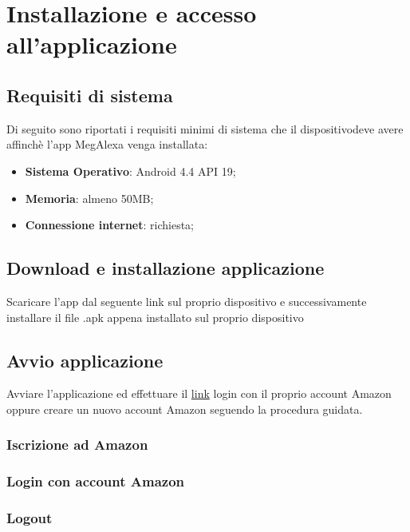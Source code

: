 \chapter{Installazione e accesso all'applicazione}
\label{Installazione}

\section{Requisiti di sistema}
Di seguito sono riportati i requisiti minimi di sistema che il dispositivodeve avere affinchè l'app MegAlexa venga installata: 

\begin{itemize}
	\item \textbf{Sistema Operativo}: Android 4.4 API 19;
	\item \textbf{Memoria}: almeno 50MB;
	\item \textbf{Connessione internet}: richiesta;
\end{itemize}

\section{Download e installazione applicazione}
Scaricare l'app dal seguente link sul proprio dispositivo
e successivamente installare il file .apk appena installato sul proprio dispositivo

\section{Avvio applicazione}
Avviare l'applicazione ed effettuare il \href{https://www.youtube.com/?gl=IT}{link} login con il proprio account Amazon oppure creare un nuovo account Amazon seguendo la procedura guidata.
\subsection{Iscrizione ad Amazon}

\subsection{Login con account Amazon}

\subsection{Logout}
